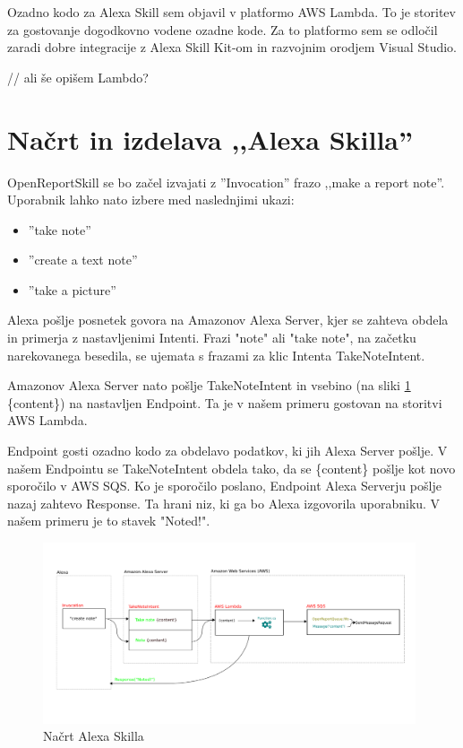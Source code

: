 \documentclass[a4paper, 12pt]{book}
\begin{document}
Ozadno kodo za Alexa Skill sem objavil v platformo AWS Lambda.
To je storitev za gostovanje dogodkovno vodene ozadne kode.
Za to platformo sem se odločil zaradi dobre integracije z Alexa Skill Kit-om in razvojnim orodjem Visual Studio.

// ali še opišem Lambdo?


\section{Načrt in izdelava ,,Alexa Skilla''}

OpenReportSkill se bo začel izvajati z ''Invocation'' frazo ,,make a report note''.
Uporabnik lahko nato izbere med naslednjimi ukazi:
\begin{itemize}
	\item ''take note''
	\item ''create a text note''
	\item ''take a picture''
\end{itemize}
Alexa pošlje posnetek govora na Amazonov Alexa Server, kjer se zahteva obdela in primerja z nastavljenimi Intenti.
Frazi "note" ali "take note", na začetku narekovanega besedila, se ujemata s frazami za klic Intenta TakeNoteIntent.

Amazonov Alexa Server nato pošlje TakeNoteIntent in vsebino (na sliki \ref{skill} \{content\}) na nastavljen Endpoint.
Ta je v našem primeru gostovan na storitvi AWS Lambda.

Endpoint gosti ozadno kodo za obdelavo podatkov, ki jih Alexa Server pošlje.
V našem Endpointu se TakeNoteIntent obdela tako, da se \{content\} pošlje kot novo sporočilo v AWS SQS.
Ko je sporočilo poslano, Endpoint Alexa Serverju pošlje nazaj zahtevo Response.
Ta hrani niz, ki ga bo Alexa izgovorila uporabniku.
V našem primeru je to stavek "Noted!".

\begin{figure}[H]
\begin{center}
\includegraphics[width=11cm]{skill}
\end{center}
\caption{Načrt Alexa Skilla}
\label{skill}
\end{figure}
\end{document}
